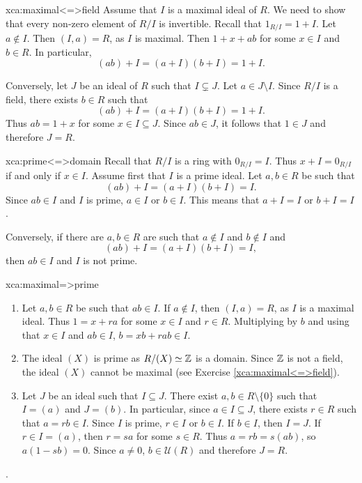 
\begin{sol}{xca:maximal<=>field}
    Assume that $I$ is a maximal ideal of $R$. 
    We need to show that every non-zero element of $R/I$ 
    is invertible. Recall 
    that $1_{R/I}=1+I$. 
    Let $a\not\in I$. Then $(I,a)=R$, as
    $I$ is maximal. Then $1+x+ab$ for some $x\in I$ and $b\in R$.
    In particular, 
    \[
    (ab)+I=(a+I)(b+I)=1+I.
    \]
    
    Conversely, let $J$ be an ideal of $R$ 
    such that $I\subsetneq J$. Let $a\in J\setminus I$. 
    Since $R/I$ is a field, there exists $b\in R$ such that
    \[
    (ab)+I=(a+I)(b+I)=1+I.
    \]
    Thus $ab=1+x$ for some $x\in I\subseteq J$. Since $ab\in J$, 
    it follows that $1\in J$ and therefore $J=R$. 
\end{sol}

\begin{sol}{xca:prime<=>domain}
    Recall that $R/I$ is a ring with 
    $0_{R/I}=I$. Thus $x+I=0_{R/I}$ if and only if $x\in I$. 
    Assume first that $I$ is a prime ideal. 
    Let $a,b\in R$ be such that 
    \[
    (ab)+I=(a+I)(b+I)=I.
    \]
    Since
    $ab\in I$ and $I$ is prime, $a\in I$ or $b\in I$. This means
    that $a+I=I$ or $b+I=I$. 
    
    Conversely, if there are $a,b\in R$ 
    are such that $a\not\in I$ and $b\not\in I$ and 
    \[
    (ab)+I=(a+I)(b+I)=I,
    \]
    then $ab\in I$ and $I$ is not prime. 
\end{sol}

\begin{sol}{xca:maximal=>prime}\
\begin{enumerate}
    \item Let $a,b\in R$ be such that $ab\in I$. If $a\not\in I$, 
    then $(I,a)=R$, as $I$ is a maximal ideal. Thus $1=x+ra$ for
    some $x\in I$ and $r\in R$. Multiplying by $b$ and using
    that $x\in I$ and $ab\in I$,  
    $b=xb+rab\in I$. 
    \item The ideal $(X)$ is prime as $R/(X)\simeq\mathbb{Z}$ is a domain. Since     $\mathbb{Z}$ is not a field, the ideal $(X)$ cannot be maximal (see
        Exercise \ref{xca:maximal<=>field}). 
    \item Let $J$ be an ideal such that $I\subseteq J$. There 
        exist $a,b\in R\setminus\{0\}$
        such that $I=(a)$ and $J=(b)$. In particular, 
        since $a\in I\subseteq J$, there exists $r\in R$ such that
        $a=rb\in I$. Since $I$ is prime, $r\in I$ or $b\in I$. 
        If $b\in I$, then $I=J$. If $r\in I=(a)$, then 
        $r=sa$ for some $s\in R$. Thus  
        $a=rb=s(ab)$, so $a(1-sb)=0$. Since $a\ne 0$, 
        $b\in\mathcal{U}(R)$ and therefore $J=R$. 
\end{enumerate}
. 
\end{sol}


